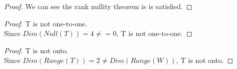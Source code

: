 \documentclass[12pt]{article}
\newenvironment{exercise}[2][Exercise]{\begin{trivlist}
\item[\hskip \labelsep{\bfseries #1}\hskip \labelsep{\bfseries #2.}]}{\end{trivlist}}
\begin{document}
\begin{exercise}{2.1.4}
\begin{proof}
        \noindent We can see the rank nullity theorem is is satisfied.

    \end{proof}

    \begin{proof} T is not one-to-one. \\

        \noindent Since $Dim(Null(T)) = 4 \neq = 0$, T is not one-to-one.

    \end{proof}

    \begin{proof} T is not onto. \\

        \noindent Since $Dim(Range(T)) = 2 \neq Dim(Range(W))$, T is not onto.

    \end{proof}

\end{exercise}
\end{document}
